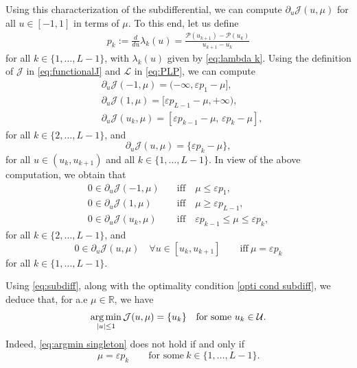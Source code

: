 \documentclass[9pt,shortpaper,twoside,web]{ieeecolor}
\begin{document}
Using this characterization of the subdifferential, we can compute $\partial_u\mathcal{J}(u,\mu)$ for all $u\in [-1,1]$ in terms of $\mu$. To this end, let us define
\begin{align*} 
	p_k := \frac{d}{du}\lambda_k(u) = \frac{\mathcal{P}(u_{k+1}) - \mathcal{P} (u_k) }{u_{k+1} - u_k} 
\end{align*} 
for all $k\in \{1, \ldots, L-1\}$, with $\lambda_k(u)$ given by \eqref{eq:lambda k}. Using the definition of $\mathcal{J}$ in \eqref{eq:functionalJ} and $\mathcal{L}$ in \eqref{eq:PLP}, we can compute
\begin{align*}
	&\partial_u \mathcal{J} (-1,\mu) = (-\infty, \varepsilon p_1 -\mu], 
	\\[5pt]
	&\partial_u \mathcal{J} (1,\mu) = [\varepsilon p_{L-1} -\mu, +\infty), 
	\\[5pt]
	&\partial_u \mathcal{J} (u_k,\mu) = [\varepsilon p_{k-1} -\mu,  \, \varepsilon p_k -\mu],
\end{align*}
for all $k\in \{ 2, \ldots, L-1\}$, and
\begin{equation*}
	\partial_u \mathcal{J}(u,\mu) = \{\varepsilon p_k -\mu\},
\end{equation*}
for all $u\in (u_k, u_{k+1})$ and all $k\in \{ 1, \ldots, L-1 \}$. In view of the above computation, we obtain that
\begin{equation}\label{eq:subdiff}
	\begin{array}{ll}
		0\in \partial_u \mathcal{J} (-1,\mu) & \quad\text{iff}\quad  \mu\leq  \varepsilon p_1, 
		\\[5pt]
		0\in \partial_u \mathcal{J} (1,\mu) & \quad\text{iff} \quad \mu\geq  \varepsilon p_{L-1}, 
		\\[5pt]
		0\in \partial_u \mathcal{J} (u_k,\mu) & \quad\text{iff} \quad  \varepsilon p_{k-1} \leq \mu \leq \varepsilon p_k , 
	\end{array} 
\end{equation}
for all $k\in \{ 2, \ldots, L-1\}$,  and
\begin{equation}\label{eq:subdiff2}
	0\in \partial_u \mathcal{J} (u,\mu) \quad \forall  u\in [u_k, u_{k+1}] \qquad \text{iff} \ \mu= \varepsilon p_k
\end{equation}
for all $k\in \{ 1, \ldots, L-1 \}$.

Using \eqref{eq:subdiff}, along with the optimality condition \eqref{opti cond subdiff}, we deduce that, 
for a.e $\mu\in \mathbb{R}$, we have
\begin{equation}\label{eq:argmin singleton}
	\operatorname*{arg\,min}_{|u|\leq 1} \mathcal{J} (u,\mu) = \{u_k\} \quad \text{for some} \ u_k\in \mathcal{U}.
\end{equation}
Indeed,  \eqref{eq:argmin singleton} does not hold if and only if
\begin{equation}\label{eq:argmin non singleton}
	\mu = \varepsilon p_k \qquad \text{for some}\ k\in \{1,\ldots, L-1\}.
\end{equation}
\end{document}
